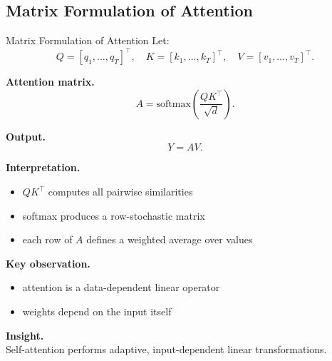 \documentclass[aspectratio=169,11pt]{beamer}
\begin{document}
\subsection{Matrix Formulation of Attention}
\begin{frame}[t,allowframebreaks]{Matrix Formulation of Attention}
\small
Let:
\[
Q = [q_1, \dots, q_T]^\top, \quad
K = [k_1, \dots, k_T]^\top, \quad
V = [v_1, \dots, v_T]^\top.
\]

\textbf{Attention matrix.}\\ \[
A = \text{softmax}\left( \frac{QK^\top}{\sqrt{d}} \right).
\]

\textbf{Output.}\\ \[
Y = A V.
\]

\textbf{Interpretation.}\\ \begin{itemize}
    \item $QK^\top$ computes all pairwise similarities
    \item softmax produces a row-stochastic matrix
    \item each row of $A$ defines a weighted average over values
\end{itemize}

\textbf{Key observation.}\\ \begin{itemize}
    \item attention is a data-dependent linear operator
    \item weights depend on the input itself
\end{itemize}

\textbf{Insight.}\\ Self-attention performs adaptive, input-dependent linear transformations.
\end{frame}
\end{document}
